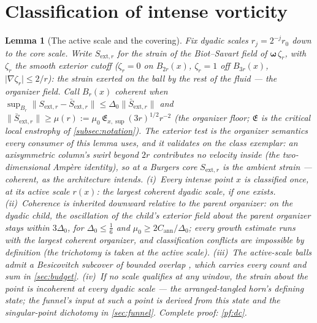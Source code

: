 \documentclass[11pt,letterpaper]{amsart}
\newtheorem{lemma}[theorem]{Lemma}
\theoremstyle{definition}
\theoremstyle{remark}
\newcommand{\vort}{\boldsymbol{\omega}}
\newcommand{\norm}[1]{\lVert #1 \rVert}
\newcommand{\abs}[1]{\lvert #1 \rvert}
\begin{document}
\section{Classification of intense vorticity}\label{sec:classification}

\begin{lemma}[The active scale and the covering]\label{lem:dc}
Fix dyadic scales $r_j=2^{-j}r_0$ down to the core scale. Write
$S_{\mathrm{ext},r}$ for the strain of the Biot--Savart field of
$\vort\,\zeta_r$, with $\zeta_r$ the smooth exterior cutoff ($\zeta_r=0$ on
$B_{2r}(x)$, $\zeta_r=1$ off $B_{3r}(x)$, $\abs{\nabla\zeta_r}\le2/r$): the
strain exerted on the ball by the rest of the fluid --- the organizer field.
Call $B_r(x)$ \emph{coherent} when
$\sup_{B_r}\norm{S_{\mathrm{ext},r}-\bar S_{\mathrm{ext},r}}
\le\Delta_0\norm{\bar S_{\mathrm{ext},r}}$ and
$\norm{\bar S_{\mathrm{ext},r}}\ge\mu(r):=\mu_0\,
\mathfrak{E}_{x,\sup}(3r)^{1/2}r^{-2}$ (the organizer floor;
$\mathfrak{E}$ is the critical local enstrophy of \cref{subsec:notation}).
The exterior test is the organizer semantics every consumer of this lemma
uses, and it validates on the class exemplar: an axisymmetric column's swirl
beyond $2r$ contributes no velocity inside (the two-dimensional Amp\`ere
identity), so at a Burgers core $S_{\mathrm{ext},r}$ is the ambient strain
--- coherent, as the architecture intends.
\textup{(i)}~Every intense point $x$ is classified once, at its \emph{active scale}
$r(x)$: the largest coherent dyadic scale, if one exists.
\textup{(ii)}~Coherence is inherited downward relative to the parent
organizer: on the dyadic child, the oscillation of the child's exterior field
about the parent organizer stays within $3\Delta_0$, for $\Delta_0\le\tfrac16$
and $\mu_0\ge2C_{\mathrm{ann}}/\Delta_0$; every growth estimate runs with the
largest coherent organizer, and classification conflicts are impossible by
definition (the trichotomy is taken at the active scale). \textup{(iii)}~The
active-scale balls admit a Besicovitch subcover of bounded overlap
\cite{Mattila1995}, which carries every count and sum in \cref{sec:budget}.
\textup{(iv)}~If no scale qualifies at any window, the strain about the point
is incoherent at every dyadic scale --- the arranged-tangled horn's defining
state; the funnel's input at such a point is \emph{derived} from this state
and the singular-point dichotomy in \cref{sec:funnel}.
Complete proof: \cref{pf:dc}.
\end{lemma}
\end{document}
